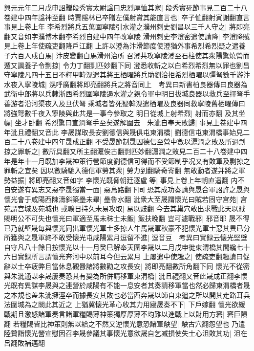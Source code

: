 興元元年二月戊申詔贈段秀實太尉諡曰忠烈厚恤其家|{
	段秀實死節事見二百二十八卷建中四年諡神至翻}
時賈隱林已卒贈左僕射賞其能直言也|{
	卒子恤翻射寅謝翻直言事見上卷上年}
李希烈將兵五萬圍寧陵引水灌之濮州刺史劉昌以三千人守之|{
	將即亮翻又音如字濮博木翻李希烈自建中四年改寧陵}
滑州刺史李澄密遣使請降|{
	李澄降賊見上卷上年使疏吏翻降戶江翻}
上許以澄為汴滑節度使澄猶外事希烈希烈疑之遣養子六百人戍白馬|{
	汴皮變翻白馬滑州治所}
召澄共攻寧陵澄至石柱使其衆陽驚燒營而遁又諷養子令剽掠|{
	令力丁翻剽匹妙翻下同}
澄悉收斬之以白希烈希烈無以罪也劉昌守寧陵凡四十五日不釋甲韓滉遣其將王栖曜將兵助劉洽拒希烈栖曜以彊弩數千游汴水夜入寧陵城|{
	滉呼廣翻將即亮翻將兵之將音同上　考異曰新書柏良器傳曰良器為武衛中郎將以兵隸浙西希烈圍寧陵遏水灌之親令軍中明日拔城良器以救兵至擇弩手善游者沿河渠夜入及旦伏弩乘城者皆死疑韓滉遣栖曜及良器同救寧陵舊栖曜傳曰將強弩數千夜入寧陵與此共是一事今參取之}
明日從城上射希烈|{
	射而亦翻}
及其坐幄|{
	坐才卧翻}
希烈驚曰宣潤弩手至矣遂解圍去　朱泚自奉天敗歸|{
	事見上卷建中四年泚且禮翻又音此}
李晟謀取長安劉德信與晟俱屯東渭橋|{
	劉德信屯東渭橋事始見二百二十八卷建中四年晟成正翻}
不受晟節制晟因德信至營中數以滬澗之敗及所過剽掠之罪斬之|{
	數所具翻又所主翻滬俟古翻剽匹妙翻滬澗之敗見二百二十八卷建中四年是年十一月既加李晟神策行營節度劉德信可得而不受節制乎况又有敗軍及剽掠之罪斬之宜矣}
因以數騎馳入德信軍勞其衆|{
	勞力到翻騎奇寄翻}
無敢動者遂并將之軍勢益振|{
	將即亮翻又音如字}
李懷光既脅朝廷逐盧等|{
	事見上卷上年朝直遥翻}
内不自安遂有異志又惡李晟獨當一面|{
	惡烏路翻下同}
恐其成功奏請與晟合軍詔許之晟與懷光會于咸陽西陳濤斜築壘未畢|{
	壘魯水翻}
泚衆大至晟謂懷光曰賊若固守宫苑|{
	宫苑謂宫城及苑城也}
或曠日持久未易攻取|{
	易以豉翻}
今去其巢穴敢出求戰此天以賊賜明公不可失也懷光曰軍適至馬未秣士未飯|{
	飯扶晩翻}
豈可遽戰邪|{
	邪音耶}
晟不得已乃就壁晟每與懷光同出軍懷光軍士多掠人牛馬晟軍秋豪不犯懷光軍士惡其異已分所獲與之晟軍終不敢受懷光屯咸陽累月逗留不進|{
	逗音豆　考異曰實録云懷光堅壁自守凡八十餘日按懷光以十一月癸巳解奉天圍李晟以二月戊申徙東渭橋其間纔七十六日實録所言謂懷光奔河中以前耳今但云累月}
上屢遣中使趣之|{
	使疏吏翻趣讀曰促}
辭以士卒疲弊且當休息觀釁諸將數勸之攻長安|{
	將即亮翻數所角翻下同}
懷光不從密與朱泚通謀李晟屢奏恐其有變為所併請移軍東渭橋|{
	泚且禮翻又音此晟成正翻李懷光既有異謀李晟與之連營於咸陽有不能一息安者其奏請移軍當也然必歸東渭橋者晟之本規也盖朱泚擁涇卒而據長安其敗也必當西奔晟以師自東逼之所以開其走路耳兵法圍城為之闕此其近之}
上猶冀懷光革心收其力用寢晟奏不下|{
	下戶嫁翻}
懷光欲緩戰期且激怒諸軍奏言諸軍糧賜薄神策獨厚厚薄不均難以進戰上以財用方窘|{
	窘巨隕翻}
若糧賜皆比神策則無以給之不然又逆懷光意恐諸軍觖望|{
	觖古穴翻怨望也}
乃遣陸䞇詣懷光營宣慰因召李晟參議其事懷光意欲晟自乞减損使失士心沮敗其功|{
	沮在呂翻敗補邁翻}
